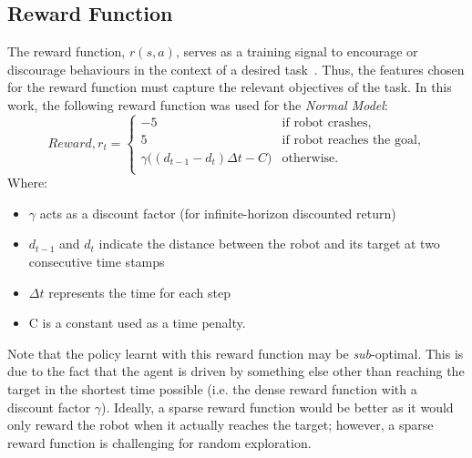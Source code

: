 \subsection{Reward Function}
The reward function, $r(s, a)$, serves as a training signal to encourage or discourage behaviours in the context of a desired task~\cite{zhu_safe_2019}. Thus, the features chosen for the reward function must capture the relevant objectives of the task. In this work, the following reward function was used for the \textit{Normal Model}:
\begin{equation*}
Reward, r_{t} = 
\begin{cases}
  -5& \text{if robot crashes},\\   
  5& \text{if robot reaches the goal},\\  
  \gamma{\bigg((d_{t-1} - d_{t})\Delta{t} - C\bigg)}& \text{otherwise}.\\ 
\end{cases}
\end{equation*}
Where:
\begin{itemize}
\item $\gamma$ acts as a discount factor (for infinite-horizon discounted return)
\item $d_{t-1}$ and $d_{t}$ indicate the distance between the robot and its target at two consecutive time stamps
\item $\Delta{t}$ represents the time for each step
\item C is a constant used as a time penalty.
\end{itemize}

Note that the policy learnt with this reward function may be \textit{sub}-optimal. This is due to the fact that the agent is driven by something else other than reaching the target in the shortest time possible (i.e. the dense reward function with a discount factor $\gamma$). Ideally, a sparse reward function would be better as it would only reward the robot when it actually reaches the target; however, a sparse reward function is challenging for random exploration.

